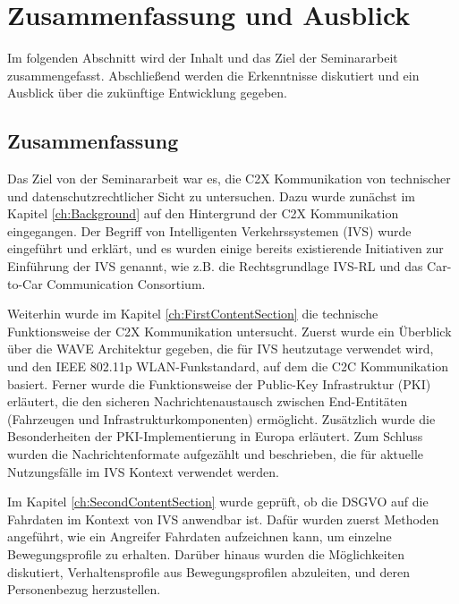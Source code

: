 
\section{Zusammenfassung und Ausblick}
\label{ch:Conclusion}

Im folgenden Abschnitt wird der Inhalt und das Ziel der Seminararbeit zusammengefasst. Abschließend werden die Erkenntnisse diskutiert und ein Ausblick über die zukünftige Entwicklung gegeben. 

\subsection{Zusammenfassung}

Das Ziel von der Seminararbeit war es, die C2X Kommunikation von technischer und datenschutzrechtlicher Sicht zu untersuchen. Dazu wurde zunächst im Kapitel \ref{ch:Background} auf den Hintergrund der C2X Kommunikation eingegangen. Der Begriff von Intelligenten Verkehrssystemen (IVS) wurde eingeführt und erklärt, und es wurden einige bereits existierende Initiativen zur Einführung der IVS genannt, wie z.B. die Rechtsgrundlage IVS-RL und das Car-to-Car Communication Consortium.

Weiterhin wurde im Kapitel \ref{ch:FirstContentSection} die technische Funktionsweise der C2X Kommunikation untersucht. Zuerst wurde ein Überblick über die WAVE Architektur gegeben, die für IVS heutzutage verwendet wird, und den IEEE 802.11p WLAN-Funkstandard, auf dem die C2C Kommunikation basiert. Ferner wurde die Funktionsweise der Public-Key Infrastruktur (PKI) erläutert, die den sicheren Nachrichtenaustausch zwischen End-Entitäten (Fahrzeugen und Infrastrukturkomponenten) ermöglicht. Zusätzlich wurde die Besonderheiten der PKI-Implementierung in Europa erläutert. Zum Schluss wurden die Nachrichtenformate aufgezählt und beschrieben, die für aktuelle Nutzungsfälle im IVS Kontext verwendet werden. 

Im Kapitel \ref{ch:SecondContentSection} wurde geprüft, ob die DSGVO auf die Fahrdaten im Kontext von IVS anwendbar ist. Dafür wurden zuerst Methoden angeführt, wie ein Angreifer Fahrdaten aufzeichnen kann, um einzelne Bewegungsprofile zu erhalten. Darüber hinaus wurden die Möglichkeiten diskutiert, Verhaltensprofile aus Bewegungsprofilen abzuleiten, und deren Personenbezug herzustellen. 

